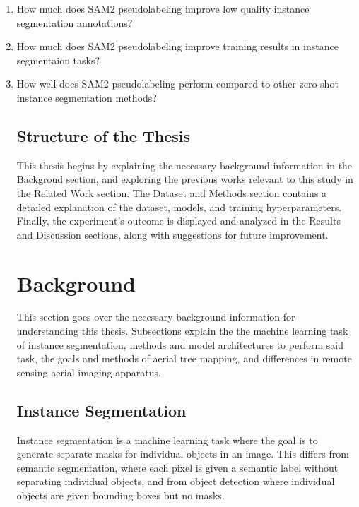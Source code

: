 \documentclass[english, 12pt, a4paper, sci, utf8, a-2b, online]{aaltothesis}
\begin{document}
\begin{enumerate}
\item How much does SAM2 pseudolabeling improve low quality instance segmentation annotations?
\item How much does SAM2 pseudolabeling improve training results in instance segmentaion tasks?
\item How well does SAM2 pseudolabeling perform compared to other zero-shot instance segmentation methods?

\subsection{Structure of the Thesis}

This thesis begins by explaining the necessary background information in the Backgroud section, and exploring the previous works relevant to this study in the Related Work section. The Dataset and Methods section contains a detailed explanation of the dataset, models, and training hyperparameters. Finally, the experiment's outcome is displayed and analyzed in the Results and Discussion sections, along with suggestions for future improvement.
\begin{end}

\newpage
\section{Background}

This section goes over the necessary background information for understanding this thesis. Subsections explain the the machine learning task of instance segmentation, methods and model architectures to perform said task, the goals and methods of aerial tree mapping, and differences in remote sensing aerial imaging apparatus.

\subsection{Instance Segmentation}

Instance segmentation is a machine learning task where the goal is to generate separate masks for individual objects in an image. This differs from semantic segmentation, where each pixel is given a semantic label without separating individual objects, and from object detection where individual objects are given bounding boxes but no masks.
\newline
{}
\newline


\end{end}
\end{enumerate}
\end{document}
